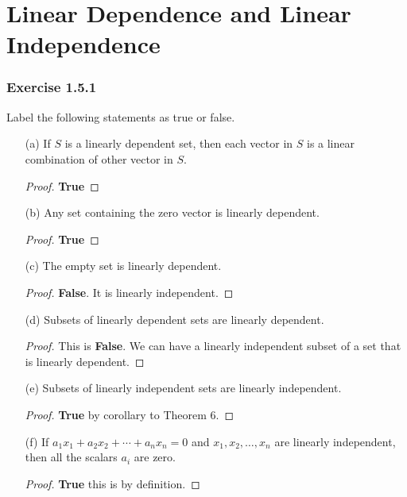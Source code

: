 \section{Linear Dependence and Linear Independence}

\subsubsection{Exercise 1.5.1} Label the following statements as true or false.

\begin{enumerate}
    \item[(a)] If \( S  \) is a linearly dependent set, then each vector in \( S  \) is a linear combination of other vector in \( S  \).
        \begin{proof}
        \textbf{True}
        \end{proof}
    \item[(b)] Any set containing the zero vector is linearly dependent.
        \begin{proof}
        \textbf{True}
        \end{proof}
    \item[(c)] The empty set is linearly dependent.
        \begin{proof}
        \textbf{False}. It is linearly independent.
        \end{proof}
    \item[(d)] Subsets of linearly dependent sets are linearly dependent. 
        \begin{proof}
        This is \textbf{False}. We can have a linearly independent subset of a set that is linearly dependent.
        \end{proof}
    \item[(e)] Subsets of linearly independent sets are linearly independent.
        \begin{proof}
        \textbf{True} by corollary to Theorem 6.
        \end{proof}
    \item[(f)] If \( a_{1} x_{1} + a_{2} x_{2} + \cdots + a_{n} x_{n} = 0  \) and \( x_{1}, x_{2}, \dots, x_{n}  \) are linearly independent, then all the scalars \( a_{i}  \) are zero.
        \begin{proof}
       \textbf{True} this is by definition. 
        \end{proof}
\end{enumerate}

